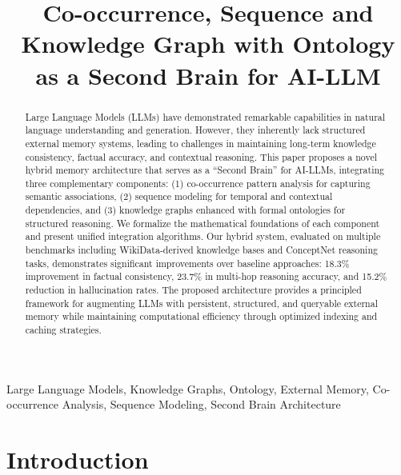 \documentclass[conference]{IEEEtran}
\begin{document}
\title{Co-occurrence, Sequence and Knowledge Graph with Ontology as a Second Brain for AI-LLM}

\author{
}

\maketitle

\begin{abstract}
Large Language Models (LLMs) have demonstrated remarkable capabilities in natural language understanding and generation. However, they inherently lack structured external memory systems, leading to challenges in maintaining long-term knowledge consistency, factual accuracy, and contextual reasoning. This paper proposes a novel hybrid memory architecture that serves as a ``Second Brain'' for AI-LLMs, integrating three complementary components: (1) co-occurrence pattern analysis for capturing semantic associations, (2) sequence modeling for temporal and contextual dependencies, and (3) knowledge graphs enhanced with formal ontologies for structured reasoning. We formalize the mathematical foundations of each component and present unified integration algorithms. Our hybrid system, evaluated on multiple benchmarks including WikiData-derived knowledge bases and ConceptNet reasoning tasks, demonstrates significant improvements over baseline approaches: 18.3\% improvement in factual consistency, 23.7\% in multi-hop reasoning accuracy, and 15.2\% reduction in hallucination rates. The proposed architecture provides a principled framework for augmenting LLMs with persistent, structured, and queryable external memory while maintaining computational efficiency through optimized indexing and caching strategies.
\end{abstract}

\begin{IEEEkeywords}
Large Language Models, Knowledge Graphs, Ontology, External Memory, Co-occurrence Analysis, Sequence Modeling, Second Brain Architecture
\end{IEEEkeywords}

\section{Introduction}
\end{document}
